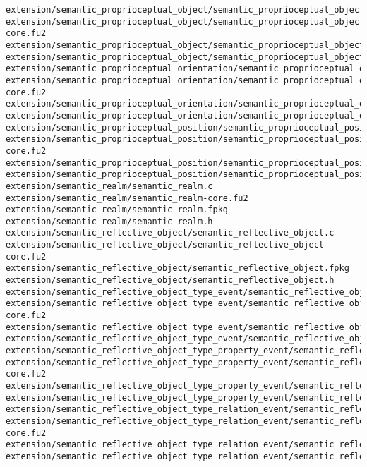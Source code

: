 \begin{lstlisting}
extension/semantic_proprioceptual_object/semantic_proprioceptual_object.c
extension/semantic_proprioceptual_object/semantic_proprioceptual_object-core.fu2
extension/semantic_proprioceptual_object/semantic_proprioceptual_object.fpkg
extension/semantic_proprioceptual_object/semantic_proprioceptual_object.h
extension/semantic_proprioceptual_orientation/semantic_proprioceptual_orientation.c
extension/semantic_proprioceptual_orientation/semantic_proprioceptual_orientation-core.fu2
extension/semantic_proprioceptual_orientation/semantic_proprioceptual_orientation.fpkg
extension/semantic_proprioceptual_orientation/semantic_proprioceptual_orientation.h
extension/semantic_proprioceptual_position/semantic_proprioceptual_position.c
extension/semantic_proprioceptual_position/semantic_proprioceptual_position-core.fu2
extension/semantic_proprioceptual_position/semantic_proprioceptual_position.fpkg
extension/semantic_proprioceptual_position/semantic_proprioceptual_position.h
extension/semantic_realm/semantic_realm.c
extension/semantic_realm/semantic_realm-core.fu2
extension/semantic_realm/semantic_realm.fpkg
extension/semantic_realm/semantic_realm.h
extension/semantic_reflective_object/semantic_reflective_object.c
extension/semantic_reflective_object/semantic_reflective_object-core.fu2
extension/semantic_reflective_object/semantic_reflective_object.fpkg
extension/semantic_reflective_object/semantic_reflective_object.h
extension/semantic_reflective_object_type_event/semantic_reflective_object_type_event.c
extension/semantic_reflective_object_type_event/semantic_reflective_object_type_event-core.fu2
extension/semantic_reflective_object_type_event/semantic_reflective_object_type_event.fpkg
extension/semantic_reflective_object_type_event/semantic_reflective_object_type_event.h
extension/semantic_reflective_object_type_property_event/semantic_reflective_object_type_property_event.c
extension/semantic_reflective_object_type_property_event/semantic_reflective_object_type_property_event-core.fu2
extension/semantic_reflective_object_type_property_event/semantic_reflective_object_type_property_event.fpkg
extension/semantic_reflective_object_type_property_event/semantic_reflective_object_type_property_event.h
extension/semantic_reflective_object_type_relation_event/semantic_reflective_object_type_relation_event.c
extension/semantic_reflective_object_type_relation_event/semantic_reflective_object_type_relation_event-core.fu2
extension/semantic_reflective_object_type_relation_event/semantic_reflective_object_type_relation_event.fpkg
extension/semantic_reflective_object_type_relation_event/semantic_reflective_object_type_relation_event.h

\end{lstlisting}
